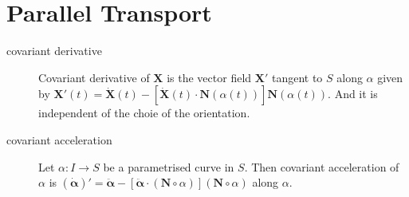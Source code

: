 \section{Parallel Transport}
\begin{description}
	\item[covariant derivative] Covariant derivative of $\mathbf{X}$ is the vector field $\mathbf{X}'$ tangent to $S$ along $\alpha$ given by $\mathbf{X}'(t) = \dot{\mathbf{X}}(t) - [\dot{\mathbf{X}}(t) \cdot \mathbf{N}(\alpha(t))]\mathbf{N}(\alpha(t))$. And it is independent of the choie of the orientation.
	\item[covariant acceleration] Let $\alpha : I \to S$ be a parametrised curve in $S$. Then covariant acceleration of $\alpha$ is $(\dot{\boldsymbol{\alpha}})' = \ddot{\boldsymbol{\alpha}} - \left[ \ddot{\boldsymbol{\alpha}} \cdot (\mathbf{N} \circ \alpha) \right] (\mathbf{N} \circ \alpha)$ along $\alpha$.
\end{description}
